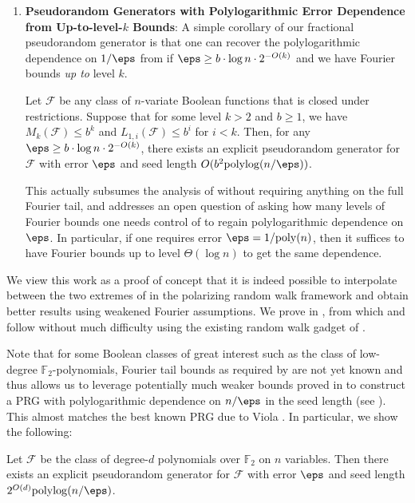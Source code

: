 \begin{enumerate}
\item \textbf{Pseudorandom Generators with Polylogarithmic Error Dependence from Up-to-level-$k$ Bounds}: A simple corollary of our fractional pseudorandom generator is that one can recover the polylogarithmic dependence on $1/\eps$ from \cite{CHHL} if $\eps \geq b\cdot \log n \cdot 2^{-O(k)}$ and we have Fourier bounds \emph{up to} level $k$. 
\begin{corollary}
\label{cor:polylogerr}
Let $\mathcal{F}$ be any class of $n$-variate Boolean functions that is closed under restrictions.  Suppose that for some level $k>2$ and $b\geq 1$, we have $M_k(\mathcal{F})\leq b^k$ and  $L_{1,i}(\mathcal{F})\leq b^{i}$ for $i<k$. Then, for any $\eps\geq b\cdot\log n \cdot 2^{-O(k)}$, there exists an explicit pseudorandom generator for $\mathcal{F}$ with error $\eps$ and seed length $O( b^{2} \mathrm{polylog}(n/\eps))$.
\end{corollary}
 
  This actually subsumes the analysis of \cite{CHHL} without requiring anything on the full Fourier tail, and addresses an open question of \cite{CHLT} asking how many levels of Fourier bounds one needs control of to regain polylogarithmic dependence on $\eps$. In particular, if one requires error $\eps = 1/\mathrm{poly}(n)$, then it suffices to have Fourier bounds up to level $\Theta(\log n)$ to get the same dependence.
\end{enumerate}
We view this work as a proof of concept that it is indeed possible to interpolate between the two extremes of \cite{CHHL,CHLT} in the polarizing random walk framework and obtain better results using weakened Fourier assumptions.  We prove  in , from which  and  follow without much difficulty using the existing random walk gadget of \cite{CHHL}. 

Note that for some Boolean classes of great interest such as the class of low-degree $\mathbb{F}_2$-polynomials, Fourier tail bounds as required by \cite{CHHL} are not yet known and thus  allows us to leverage potentially much weaker bounds proved in \cite{CHHL} to construct a PRG with polylogarithmic dependence on $n/\eps$ in the seed length (see ).  This almost matches the best known PRG due to Viola \cite{viola2009sum}. In particular, we show the following:

\begin{THM}\label{thm:main_poly}
Let $\mathcal{F}$ be the class of degree-$d$ polynomials over $\mathbb{F}_2$ on $n$ variables. Then there exists an explicit pseudorandom generator for $\mathcal{F}$ with error $\eps$ and seed length $2^{O(d)}\mathrm{polylog}(n/\eps)$.
\end{THM}

